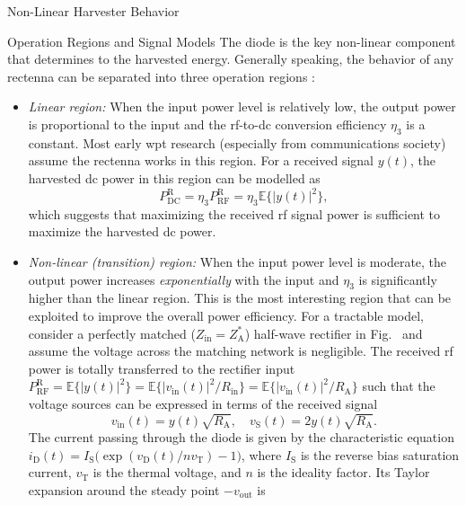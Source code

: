\begin{section}{}
\begin{subsection}{Non-Linear Harvester Behavior}
		\begin{subsubsection}{Operation Regions and Signal Models}
			The diode is the key non-linear component that determines to the harvested energy.
			Generally speaking, the behavior of any rectenna can be separated into three operation regions \cite{Clerckx2016a}:
			\begin{itemize}
				\item \emph{Linear region:} When the input power level is relatively low, the output power is proportional to the input and the \gls{rf}-to-\gls{dc} conversion efficiency $\eta_3$ is a constant. Most early \gls{wpt} research (especially from communications society) assume the rectenna works in this region. For a received signal $y(t)$, the harvested \gls{dc} power in this region can be modelled as
				\begin{equation}
					P_\mathrm{DC}^\mathrm{R} = \eta_3 P_\mathrm{RF}^\mathrm{R} = \eta_3 \mathbb{E}\bigl\{ \lvert y(t) \rvert^2 \bigr\},
					\label{eq:dc_power_linear}
				\end{equation}
				which suggests that maximizing the received \gls{rf} signal power is sufficient to maximize the harvested \gls{dc} power.
				\item \emph{Non-linear (transition) region:} When the input power level is moderate, the output power increases \emph{exponentially} with the input and $\eta_3$ is significantly higher than the linear region. This is the most interesting region that can be exploited to improve the overall power efficiency.
				For a tractable model, consider a perfectly matched ($Z_\mathrm{in} = Z_\mathrm{A}^*$) half-wave rectifier in Fig.~ and assume the voltage across the matching network is negligible. The received \gls{rf} power is totally transferred to the rectifier input $P_\mathrm{RF}^\mathrm{R} = \mathbb{E}\bigl\{ \lvert y(t) \rvert^2 \bigr\} = \mathbb{E}\bigl\{ \lvert v_\mathrm{in}(t) \rvert^2 / R_\mathrm{in} \bigr\} = \mathbb{E}\bigl\{ \lvert v_\mathrm{in}(t) \rvert^2 / R_\mathrm{A} \bigr\}$ such that the voltage sources can be expressed in terms of the received signal \cite{Clerckx2016a}
				\begin{equation}
					v_\mathrm{in}(t) = y(t) \sqrt{R_\mathrm{A}}, \quad v_\mathrm{S}(t) = 2 y(t) \sqrt{R_\mathrm{A}}.
				\end{equation}
				The current passing through the diode is given by the characteristic equation $i_\mathrm{D}(t) = I_\mathrm{S} \bigl( \exp(v_\mathrm{D}(t) / n v_\mathrm{T}) - 1 \bigr)$, where $I_\mathrm{S}$ is the reverse bias saturation current, $v_\mathrm{T}$ is the thermal voltage, and $n$ is the ideality factor. Its Taylor expansion around the steady point $-v_\mathrm{out}$ is \cite{Clerckx2016a}

\end{itemize}
\end{subsubsection}
\end{subsection}
\end{section}
